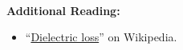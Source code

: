 ~\\

{\bf Additional Reading:}
\begin{itemize}
\item ``\href{https://en.wikipedia.org/wiki/Dielectric_loss}{Dielectric loss}'' on Wikipedia.
\end{itemize}







